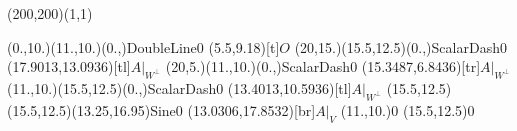 \unitlength=1bp%

\begin{feynartspicture}(200,200)(1,1)

\FADiagram{}
\FAProp(0.,10.)(11.,10.)(0.,){DoubleLine}{0}
\FALabel(5.5,9.18)[t]{$O$}
\FAProp(20,15.)(15.5,12.5)(0.,){ScalarDash}{0}
\FALabel(17.9013,13.0936)[tl]{$A|_{W^\perp}$}
\FAProp(20,5.)(11.,10.)(0.,){ScalarDash}{0}
\FALabel(15.3487,6.8436)[tr]{$A|_{W^\perp}$}
\FAProp(11.,10.)(15.5,12.5)(0.,){ScalarDash}{0}
\FALabel(13.4013,10.5936)[tl]{$A|_{W^\perp}$}
\FAProp(15.5,12.5)(15.5,12.5)(13.25,16.95){Sine}{0}
\FALabel(13.0306,17.8532)[br]{$A|_V$}
\FAVert(11.,10.){0}
\FAVert(15.5,12.5){0}
\end{feynartspicture}

